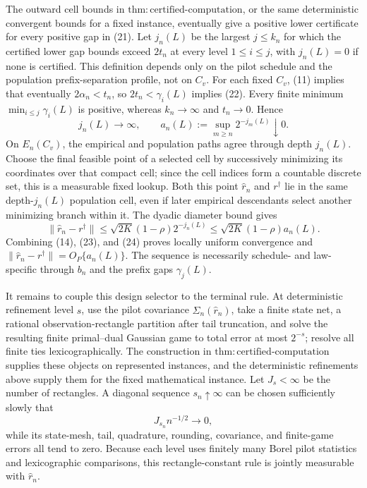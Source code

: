 The outward cell bounds in \(\mathrm{thm:certified\text{-}computation}\), or the same deterministic convergent bounds for a fixed instance, eventually give a positive lower certificate for every positive gap in (21). Let \(j_n(L)\) be the largest \(j\le k_n\) for which the certified lower gap bounds exceed \(2t_n\) at every level \(1\le i\le j\), with \(j_n(L)=0\) if none is certified. This definition depends only on the pilot schedule and the population prefix-separation profile, not on \(C_v\). For each fixed \(C_v\), (11) implies that eventually \(2\alpha_n<t_n\), so \(2t_n<\gamma_i(L)\) implies (22). Every finite minimum \(\min_{i\le j}\gamma_i(L)\) is positive, whereas \(k_n\to\infty\) and \(t_n\to0\). Hence
\[
j_n(L)\to\infty,
\qquad
a_n(L):=\sup_{m\ge n}2^{-j_m(L)}\downarrow0.
\tag{23}
\]
On \(E_n(C_v)\), the empirical and population paths agree through depth \(j_n(L)\). Choose the final feasible point of a selected cell by successively minimizing its coordinates over that compact cell; since the cell indices form a countable discrete set, this is a measurable fixed lookup. Both this point \(\widehat r_n\) and \(r^\dagger\) lie in the same depth-\(j_n(L)\) population cell, even if later empirical descendants select another minimizing branch within it. The dyadic diameter bound gives
\[
\lVert\widehat r_n-r^\dagger\rVert
\le\sqrt{2K}(1-\rho)2^{-j_n(L)}
\le\sqrt{2K}(1-\rho)a_n(L).
\tag{24}
\]
Combining (14), (23), and (24) proves locally uniform convergence and \(\lVert\widehat r_n-r^\dagger\rVert=O_P\{a_n(L)\}\). The sequence is necessarily schedule- and law-specific through \(b_n\) and the prefix gaps \(\gamma_j(L)\).

It remains to couple this design selector to the terminal rule. At deterministic refinement level \(s\), use the pilot covariance \(\widehat\Sigma_n(\widehat r_n)\), take a finite state net, a rational observation-rectangle partition after tail truncation, and solve the resulting finite primal--dual Gaussian game to total error at most \(2^{-s}\); resolve all finite ties lexicographically. The construction in \(\mathrm{thm:certified\text{-}computation}\) supplies these objects on represented instances, and the deterministic refinements above supply them for the fixed mathematical instance. Let \(J_s<\infty\) be the number of rectangles. A diagonal sequence \(s_n\uparrow\infty\) can be chosen sufficiently slowly that
\[
J_{s_n}n^{-1/2}\to0,
\tag{25}
\]
while its state-mesh, tail, quadrature, rounding, covariance, and finite-game errors all tend to zero. Because each level uses finitely many Borel pilot statistics and lexicographic comparisons, this rectangle-constant rule is jointly measurable with \(\widehat r_n\).

